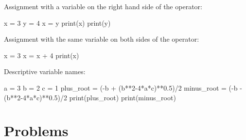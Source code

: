 \documentclass{ximera}
\begin{document}
Assignment with a variable on the right hand side of the operator:

\begin{sageCell}
	x = 3
	y = 4
	x = y
	print(x)
	print(y)
\end{sageCell}

Assignment with the same variable on both sides of the operator:

\begin{sageCell}
	x = 3
	x = x + 4
	print(x)
\end{sageCell}

Descriptive variable names:

\begin{sageCell}
	a = 3
	b = 2
	c = 1
	plus_root = (-b + (b**2-4*a*c)**0.5)/2
	minus_root = (-b - (b**2-4*a*c)**0.5)/2
	print(plus_root)
	print(minus_root)
\end{sageCell}

\section{Problems}

\begin{question}
\end{question}

\begin{question}
\end{question}
\end{document}
